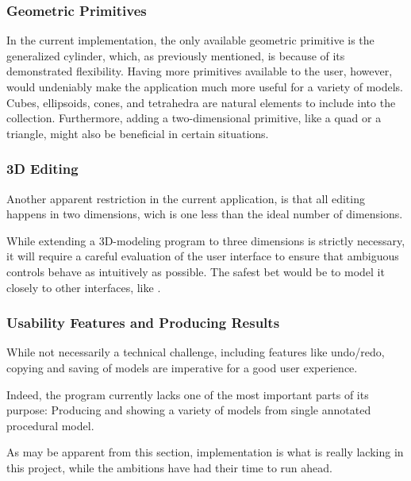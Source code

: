 \documentclass[english]{article}
\begin{document}

\subsubsection{Geometric Primitives}

In the current implementation, the only available geometric primitive is the generalized cylinder, which, as previously mentioned, is because of its demonstrated flexibility.
Having more primitives available to the user, however, would undeniably make the application much more useful for a variety of models. Cubes, ellipsoids, cones, and tetrahedra are natural elements to include into the collection. Furthermore, adding a two-dimensional primitive, like a quad or a triangle, might also be beneficial in certain situations.


\subsubsection{3D Editing}

Another apparent restriction in the current application, is that all editing happens in two dimensions, wich is one less than the ideal number of dimensions.

While extending a 3D-modeling program to three dimensions is strictly necessary, it will require a careful evaluation of the user interface to ensure that ambiguous controls behave as intuitively as possible. The safest bet would be to model it closely to other interfaces, like \cite{gingold09}.


\subsubsection{Usability Features and Producing Results}

While not necessarily a technical challenge, including features like undo/redo, copying and saving of models are imperative for a good user experience.

Indeed, the program currently lacks one of the most important parts of its purpose: Producing and showing a variety of models from single annotated procedural model.

As may be apparent from this section, implementation is what is really lacking in this project, while the ambitions have had their time to run ahead. 
\end{document}
